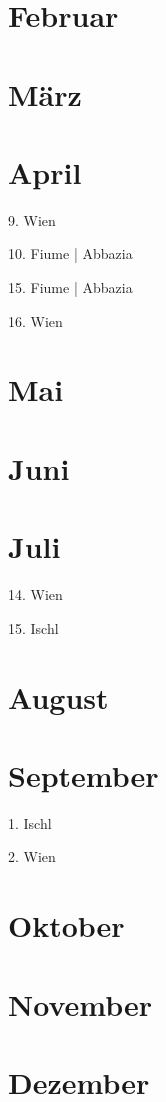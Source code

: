 \documentclass[twoside=false,titlepage=false,open=any, parskip=never, fontsize=10pt, headings=small, chapterprefix=false, appendixprefix=false, DIV=15]{scrbook}
\begin{document}
\begin{multicols}{3}
            \section*{Februar}
            \section*{März}
            \section*{April}
            9. Wien\par
            10. Fiume | Abbazia\par
            15. Fiume | Abbazia\par
            16. Wien\par
            \section*{Mai}
            \section*{Juni}
            \section*{Juli}
            14. Wien\par
            15. Ischl\par
            \section*{August}
            \section*{September}
            1. Ischl\par
            2. Wien\par
            \section*{Oktober}
            \section*{November}
            \section*{Dezember}

\end{multicols}
\end{document}
